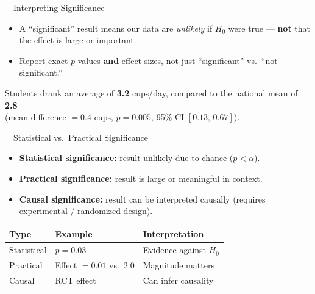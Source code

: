 \documentclass[aspectratio=169,11pt]{beamer}
\begin{document}
\begin{frame}{\ \ Interpreting Significance}
  \begin{keybox}
    \begin{itemize}
      \item A ``significant'' result means our data are \emph{unlikely} if $H_0$
            were true --- \textbf{not} that the effect is large or important.
      \item Report exact $p$-values \textbf{and} effect sizes, not just
            ``significant'' vs.\ ``not significant.''
    \end{itemize}
  \end{keybox}
  \vspace{0.5em}
  \begin{tcolorbox}[colback=white,colframe=qrblue,arc=2pt]
    Students drank an average of \textbf{3.2} cups/day, compared to the national
    mean of \textbf{2.8} \\(mean difference $= 0.4$ cups, $p = 0.005$,
    95\% CI $[0.13,\,0.67]$).
  \end{tcolorbox}
\end{frame}

\begin{frame}{\ \ Statistical vs.\ Practical Significance}
  \begin{itemize}
    \item \textbf{Statistical significance:} result unlikely due to chance ($p < \alpha$).
    \item \textbf{Practical significance:} result is large or meaningful in context.
    \item \textbf{Causal significance:} result can be interpreted causally
          (requires experimental / randomized design).
  \end{itemize}
  \vspace{0.6em}
  \begin{center}
  \renewcommand{\arraystretch}{1.3}
  \begin{tabular}{@{}lll@{}}
    \toprule
    \textbf{Type} & \textbf{Example} & \textbf{Interpretation}\\
    \midrule
    Statistical & $p = 0.03$ & Evidence against $H_0$\\
    Practical   & Effect $= 0.01$ vs.\ $2.0$ & Magnitude matters\\
    Causal      & RCT effect & Can infer causality\\
    \bottomrule
  \end{tabular}
  \end{center}
\end{frame}
\end{document}

